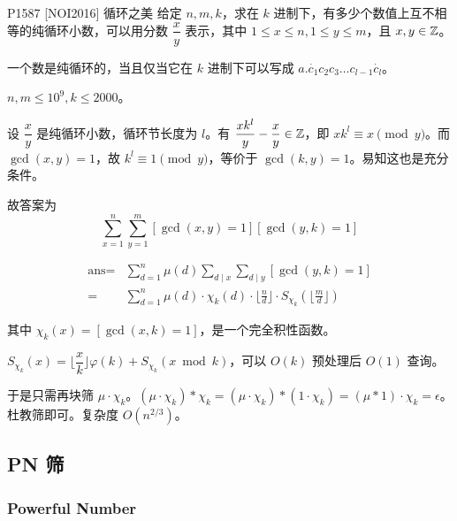 \documentclass[../main.tex]{subfiles}
\begin{document}
\subsubsection{}

\begin{frame}{P1587 [NOI2016] 循环之美}
给定 $n,m,k$，求在 $k$ 进制下，有多少个数值上互不相等的纯循环小数，可以用分数 $\dfrac{x}{y}$ 表示，其中 $1\le x\le n,1\le y\le m$，且 $x,y\in\mathbb{Z}$。

一个数是纯循环的，当且仅当它在 $k$ 进制下可以写成 $a.\dot{c_1}c_2c_3\dots c_{l-1}\dot{c_l}$。

$n,m\le 10^9,k\le 2000$。
\end{frame}

\begin{frame}
设 $\dfrac{x}{y}$ 是纯循环小数，循环节长度为 $l$。有 $\dfrac{xk^l}{y}-\dfrac{x}{y}\in\mathbb{Z}$，即 $xk^l\equiv x\pmod y$。而 $\gcd(x,y)=1$，故 $k^l\equiv 1\pmod y$，等价于 $\gcd(k,y)=1$。易知这也是充分条件。\pause

故答案为
$$
\sum\limits_{x=1}^n\sum\limits_{y=1}^m[\gcd(x,y)=1][\gcd(y,k)=1]
$$
\end{frame}

\begin{frame}
$$
\begin{aligned}
\text{ans}=&\sum_{d=1}^n\mu(d)\sum_{d\mid x}\sum_{d\mid y}[\gcd(y,k)=1]\\
=&\sum_{d=1}^n\mu(d)\cdot\chi_k(d)\cdot\lfloor\frac{n}{d}\rfloor\cdot S_{\chi_k}(\lfloor\frac{m}{d}\rfloor)
\end{aligned}
$$\pause

其中 $\chi_k(x)=[\gcd(x,k)=1]$，是一个完全积性函数。\pause

$S_{\chi_k}(x)=\lfloor\dfrac{x}{k}\rfloor\varphi(k)+S_{\chi_k}(x\bmod k)$，可以 $O(k)$ 预处理后 $O(1)$ 查询。\pause

于是只需再块筛 $\mu\cdot\chi_k$。$(\mu\cdot\chi_k)*\chi_k=(\mu\cdot\chi_k)*(1\cdot\chi_k)=(\mu*1)\cdot\chi_k=\epsilon$。杜教筛即可。复杂度 $O(n^{2/3})$。
\end{frame}

\subsection{PN 筛}

\subsubsection{Powerful Number}
\end{document}
